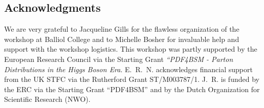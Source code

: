 \subsection*{Acknowledgments}

We are very grateful to Jacqueline Gills for the flawless organization
of the workshop at Balliol College and to Michelle Bosher for
invaluable help and support with the workshop logistics.
%
This workshop was partly supported by the European Research Council via
the Starting Grant {\it ``PDF4BSM - Parton Distributions in the
  Higgs Boson Era}.
%
E.~R.~N. acknowledges financial support from the
UK STFC via the Rutherford Grant ST/M003787/1.
%
J.~R. is funded by the ERC via the Starting Grant ``PDF4BSM'' and by the
Dutch Organization for Scientific Research (NWO).
